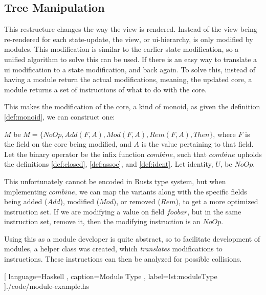 \subsection{Tree Manipulation}

This restructure changes the way the view is rendered. Instead of the view being
re-rendered for each state-update, the view, or \gls{ui}-hierarchy, is only
modified by modules. This modification is similar to the earlier state
modification, so a unified algorithm to solve this can be used. If there is an
easy way to translate a \gls{ui} modification to a state modification, and back
again. To solve this, instead of having a module return the actual
modifications, meaning, the updated core, a module returns a set of instructions
of what to do with the core.

This makes the modification of the core, a kind of monoid, as given the
definition \ref{def:monoid}, we can construct one:

\begin{exmp}
  $M$ be $M = \{ NoOp, Add(F, A), Mod(F, A), Rem(F, A), Then \}$,
  where $F$ is the field on the core being modified, and $A$ is the value
  pertaining to that field.
  Let the binary operator be the infix function $combine$, such that $combine$
  upholds the definitions \ref{def:closed}, \ref{def:assoc}, and
  \ref{def:ident}.
  Let identity, $U$, be $NoOp$.
\end{exmp}

This unfortunately cannot be encoded in Rusts type system, but when implementing
$combine$, we can map the variants along with the specific fields being added
($Add$), modified ($Mod$), or removed ($Rem$), to get a more optimized
instruction set. If we are modifying a value on field $foobar$, but in the same
instruction set, remove it, then the modifying instruction is an $NoOp$.


Using this as a module developer is quite abstract, so to facilitate development
of modules, a helper class was created, which \textit{translates} modifications
to instructions. These instructions can then be analyzed for possible
collisions.

\begin{center}
  
   [ language=Haskell
   , caption={Module Type}
   , label=lst:moduleType
   ]{./code/module-example.hs}
\end{center}

